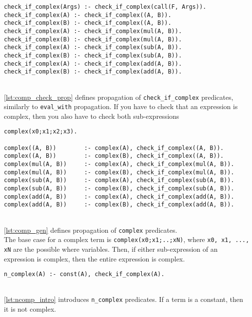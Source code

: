 \begin{lstlisting}[caption={Checking propagation}, label={lst:comp_check_prop}, firstnumber=151]
check_if_complex(Args) :- check_if_complex(call(F, Args)).
check_if_complex(A) :- check_if_complex((A, B)).
check_if_complex(B) :- check_if_complex((A, B)).
check_if_complex(A) :- check_if_complex(mul(A, B)).
check_if_complex(B) :- check_if_complex(mul(A, B)).
check_if_complex(A) :- check_if_complex(sub(A, B)).
check_if_complex(B) :- check_if_complex(sub(A, B)).
check_if_complex(A) :- check_if_complex(add(A, B)).
check_if_complex(B) :- check_if_complex(add(A, B)).
\end{lstlisting}
\mbox{} \\
\ref{lst:comp_check_prop} defines propagation of \lstinline!check_if_complex! predicates, similarly to \lstinline!eval_with! propagation. If you have to check that an expression is complex, then you also have to check both sub-expressions\\

\begin{lstlisting}[caption={Complex generation}, label={lst:comp_gen}, firstnumber=161]
complex(x0;x1;x2;x3).

complex((A, B))        :- complex(A), check_if_complex((A, B)).
complex((A, B))        :- complex(B), check_if_complex((A, B)).
complex(mul(A, B))     :- complex(A), check_if_complex(mul(A, B)).
complex(mul(A, B))     :- complex(B), check_if_complex(mul(A, B)).
complex(sub(A, B))     :- complex(A), check_if_complex(sub(A, B)).
complex(sub(A, B))     :- complex(B), check_if_complex(sub(A, B)).
complex(add(A, B))     :- complex(A), check_if_complex(add(A, B)).
complex(add(A, B))     :- complex(B), check_if_complex(add(A, B)).
\end{lstlisting}
\mbox{} \\
\ref{lst:comp_gen} defines propagation of \lstinline!complex! predicates. \\
The base case for a complex term is \lstinline!complex(x0;x1;..;xN)!, where \lstinline!x0, x1, ..., xN! are the possible where variables. Then, if either sub-expression of an expression is complex, then the entire expression is complex. \\

\begin{lstlisting}[caption={Non complex introduction}, label={lst:ncomp_intro}, firstnumber=172]
n_complex(A) :- const(A), check_if_complex(A).
\end{lstlisting}
\mbox{} \\
\ref{lst:ncomp_intro} introduces \lstinline!n_complex! predicates. If a term is a constant, then it is not complex. \\


